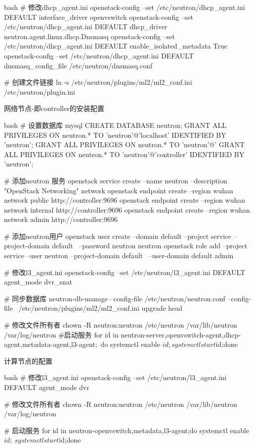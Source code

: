 \begin{outline}[enumerate]
\begin{code-block}{bash}
# 修改dhcp_agent.ini
openstack-config --set /etc/neutron/dhcp_agent.ini DEFAULT interface_driver openvswitch
openstack-config --set /etc/neutron/dhcp_agent.ini DEFAULT dhcp_driver neutron.agent.linux.dhcp.Dnsmasq
openstack-config --set /etc/neutron/dhcp_agent.ini DEFAULT enable_isolated_metadata True
openstack-config --set /etc/neutron/dhcp_agent.ini DEFAULT dnsmasq_config_file /etc/neutron/dnsmasq.conf

# 创建文件链接
ln -s /etc/neutron/plugins/ml2/ml2_conf.ini /etc/neutron/plugin.ini
\end{code-block}

\1 网络节点-即controller的安装配置
\begin{code-block}{bash}
# 设置数据库
mysql
CREATE DATABASE neutron;
GRANT ALL PRIVILEGES ON neutron.* TO 'neutron'@'localhost' IDENTIFIED BY 'neutron';
GRANT ALL PRIVILEGES ON neutron.* TO 'neutron'@'%
GRANT ALL PRIVILEGES ON neutron.* TO 'neutron'@'controller' IDENTIFIED BY 'neutron';

# 添加neutron 服务
openstack service create --name neutron --description "OpenStack Networking" network
openstack endpoint create --region wuhan network public http://controller:9696
openstack endpoint create --region wuhan network internal http://controller:9696
openstack endpoint create --region wuhan network admin http://controller:9696

# 添加neutron用户
openstack user create --domain default --project service --project-domain default \
    --password neutron neutron
openstack role add --project service --user neutron --project-domain default \
    --user-domain default admin

# 修改l3_agent.ini
openstack-config --set /etc/neutron/l3_agent.ini DEFAULT agent_mode dvr_snat

# 同步数据库
neutron-db-manage --config-file /etc/neutron/neutron.conf --config-file \
    /etc/neutron/plugins/ml2/ml2_conf.ini upgrade head

# 修改文件所有者
chown -R neutron:neutron /etc/neutron /var/lib/neutron /var/log/neutron
#启动服务
for id in neutron-{server,openvswitch-agent,dhcp-agent,metadata-agent,l3-agent};\
    do systemctl enable $id;systemctl start $id;done
\end{code-block}

\1 计算节点的配置
\begin{code-block}{bash}
# 修改l3_agent.ini
openstack-config --set /etc/neutron/l3_agent.ini DEFAULT agent_mode dvr

# 修改文件所有者
chown -R neutron:neutron /etc/neutron /var/lib/neutron /var/log/neutron

# 启动服务
for id in neutron-{openvswitch,metadata,l3}-agent;do systemctl enable $id;\
    systemctl start $id;done
\end{code-block}

\end{outline}

